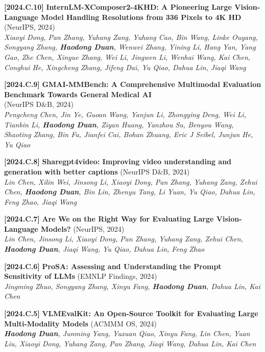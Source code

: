\documentclass{resume}
\newcommand{\itemgap}{\vspace{-1mm}}%
\begin{document}
\textbf{[2024.C.10]} \textbf{InternLM-XComposer2-4KHD: A Pioneering Large Vision-Language Model Handling Resolutions from 336 Pixels to 4K HD} (NeurIPS, 2024) \\ 
\textit{Xiaoyi Dong, Pan Zhang, Yuhang Zang, Yuhang Cao, Bin Wang, Linke Ouyang, Songyang Zhang, \textbf{Haodong Duan}, Wenwei Zhang, Yining Li, Hang Yan, Yang Gao, Zhe Chen, Xinyue Zhang, Wei Li, Jingwen Li, Wenhai Wang, Kai Chen, Conghui He, Xingcheng Zhang, Jifeng Dai, Yu Qiao, Dahua Lin, Jiaqi Wang} \\

\itemgap

\textbf{[2024.C.9]} \textbf{GMAI-MMBench: A Comprehensive Multimodal Evaluation Benchmark Towards General Medical AI}  \\ (NeurIPS D\&B, 2024) \\ 
\textit{Pengcheng Chen, Jin Ye, Guoan Wang, Yanjun Li, Zhongying Deng, Wei Li, Tianbin Li, \textbf{Haodong Duan}, Ziyan Huang, Yanzhou Su, Benyou Wang, Shaoting Zhang, Bin Fu, Jianfei Cai, Bohan Zhuang, Eric J Seibel, Junjun He, Yu Qiao} \\ 

\itemgap

\textbf{[2024.C.8]} \textbf{Sharegpt4video: Improving video understanding and generation with better captions} (NeurIPS D\&B, 2024) \\
\textit{Lin Chen, Xilin Wei, Jinsong Li, Xiaoyi Dong, Pan Zhang, Yuhang Zang, Zehui Chen, \textbf{Haodong Duan}, Bin Lin, Zhenyu Tang, Li Yuan, Yu Qiao, Dahua Lin, Feng Zhao, Jiaqi Wang} \\

\itemgap

\textbf{[2024.C.7]} \textbf{Are We on the Right Way for Evaluating Large Vision-Language Models?} (NeurIPS, 2024) \\ 
\textit{Lin Chen, Jinsong Li, Xiaoyi Dong, Pan Zhang, Yuhang Zang, Zehui Chen, \textbf{Haodong Duan}, Jiaqi Wang, Yu Qiao, Dahua Lin, Feng Zhao} \\

\itemgap

\textbf{[2024.C.6]} \textbf{ProSA: Assessing and Understanding the Prompt Sensitivity of LLMs}  (EMNLP Findings, 2024) \\
\textit{Jingming Zhuo, Songyang Zhang, Xinyu Fang, \textbf{Haodong Duan}, Dahua Lin, Kai Chen} \\

\itemgap

\textbf{[2024.C.5]} \textbf{VLMEvalKit: An Open-Source Toolkit for Evaluating Large Multi-Modality Models} (ACMMM OS, 2024) \\ 
\textit{\textbf{Haodong Duan}, Junming Yang, Yuxuan Qiao, Xinyu Fang, Lin Chen, Yuan Liu, Xiaoyi Dong, Yuhang Zang, Pan Zhang, Jiaqi Wang, Dahua Lin, Kai Chen} \\
\end{document}

